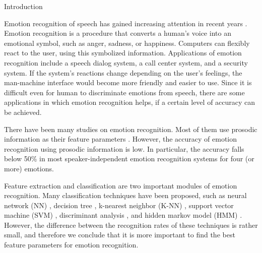 \documentclass[english]{jnlp_1.3e}
\begin{document}
\maketitle


    \let\thline

\section{Introduction}

Emotion recognition of speech has gained increasing attention in recent years \cite{Cowie2001}. Emotion recognition is a procedure that converts a human's voice into an emotional symbol, such as anger, sadness, or happiness. Computers can flexibly react to the user, using this symbolized information. Applications of emotion recognition include a speech dialog system, a call center system, and a security system. If the system's reactions change depending on the user's feelings, the man-machine interface would become more friendly and easier to use. Since it is difficult even for human to discriminate emotions from speech, there are some applications in which emotion recognition helps, if a certain level of accuracy can be achieved.

There have been many studies on emotion recognition. Most of them use prosodic information as their feature parameters \cite{Tato2002,Yacoub2003,Oudeyer2003,Yu2001,Kwon2003,Schuller2003}. However, the accuracy of emotion recognition using prosodic information is low. In particular, the accuracy falls below 50\% in most speaker-independent emotion recognition systems for four (or more) emotions.

Feature extraction and classification are two important modules of emotion recognition. Many classification techniques have been proposed, such as neural network (NN) \cite{Tato2002,Yacoub2003,Oudeyer2003}, decision tree \cite{Oudeyer2003}, k-nearest neighbor (K-NN) \cite{Oudeyer2003}, support vector machine (SVM) \cite{Yacoub2003,Oudeyer2003,Yu2001}, discriminant analysis \cite{Kwon2003}, and hidden markov model (HMM) \cite{Kwon2003,Schuller2003}. However, the difference between the recognition rates of these techniques is rather small, and therefore we conclude that it is more important to find the best feature parameters for emotion recognition.
\end{document}
